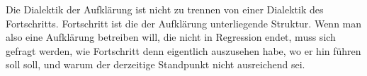 \documentclass[a4paper, 12pt]{article}
\begin{document}
\begin{onehalfspace}
\noindent 
Die Dialektik der Aufklärung ist nicht zu trennen von einer Dialektik des Fortschritts. Fortschritt ist die der Aufklärung unterliegende Struktur. Wenn man also eine Aufklärung betreiben will, die nicht in Regression endet, muss sich gefragt werden, wie Fortschritt denn eigentlich auszusehen habe, wo er hin führen soll soll, und warum der derzeitige Standpunkt nicht ausreichend sei.



\newpage

\end{onehalfspace}
\nocite{*}
\printbibliography
\end{document}
